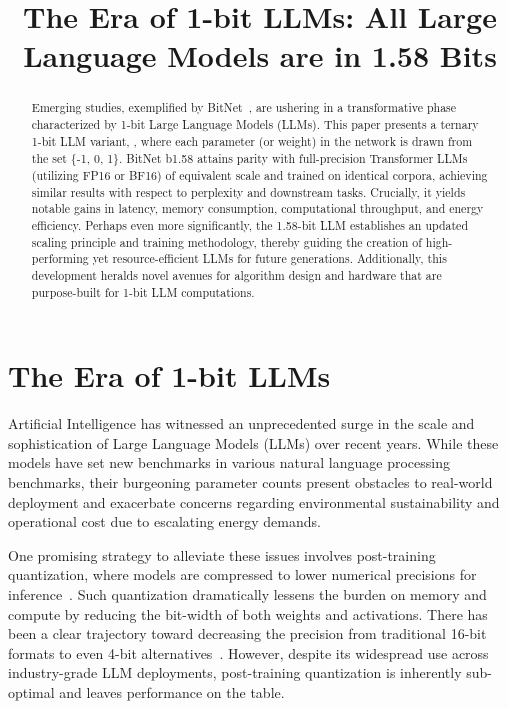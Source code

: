 \title{The Era of 1-bit LLMs: All Large Language Models are in 1.58 Bits}

\begin{abstract}
Emerging studies, exemplified by BitNet~\cite{bitnet}, are ushering in a transformative phase characterized by 1-bit Large Language Models (LLMs). This paper presents a ternary 1-bit LLM variant, \textbf{}, where each parameter (or weight) in the network is drawn from the set \{-1, 0, 1\}. BitNet b1.58 attains parity with full-precision Transformer LLMs (utilizing FP16 or BF16) of equivalent scale and trained on identical corpora, achieving similar results with respect to perplexity and downstream tasks. Crucially, it yields notable gains in latency, memory consumption, computational throughput, and energy efficiency. Perhaps even more significantly, the 1.58-bit LLM establishes an updated scaling principle and training methodology, thereby guiding the creation of high-performing yet resource-efficient LLMs for future generations. Additionally, this development heralds novel avenues for algorithm design and hardware that are purpose-built for 1-bit LLM computations.
\end{abstract}

\section{The Era of 1-bit LLMs}

Artificial Intelligence has witnessed an unprecedented surge in the scale and sophistication of Large Language Models (LLMs) over recent years. While these models have set new benchmarks in various natural language processing benchmarks, their burgeoning parameter counts present obstacles to real-world deployment and exacerbate concerns regarding environmental sustainability and operational cost due to escalating energy demands.

One promising strategy to alleviate these issues involves post-training quantization, where models are compressed to lower numerical precisions for inference~\cite{smoothquant, gptq, quip, quip_sharp}. Such quantization dramatically lessens the burden on memory and compute by reducing the bit-width of both weights and activations. There has been a clear trajectory toward decreasing the precision from traditional 16-bit formats to even 4-bit alternatives~\cite{gptq, awq}. However, despite its widespread use across industry-grade LLM deployments, post-training quantization is inherently sub-optimal and leaves performance on the table.

